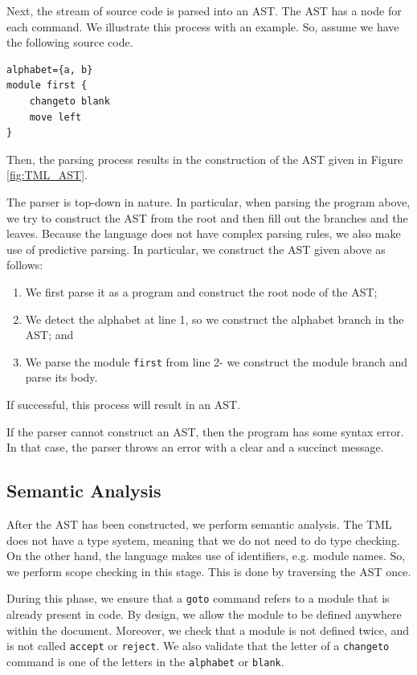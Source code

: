 Next, the stream of source code is parsed into an AST. The AST has a node for each command. We illustrate this process with an example. So, assume we have the following source code.
\begin{lstlisting}[language=TML]
alphabet={a, b}
module first {
    changeto blank
    move left
}
\end{lstlisting}
Then, the parsing process results in the construction of the AST given in Figure \ref{fig:TML_AST}. 

The parser is top-down in nature. In particular, when parsing the program above, we try to construct the AST from the root and then fill out the branches and the leaves. Because the language does not have complex parsing rules, we also make use of predictive parsing. In particular, we construct the AST given above as follows:
\begin{enumerate}
    \item We first parse it as a program and construct the root node of the AST;
    \item We detect the alphabet at line 1, so we construct the alphabet branch in the AST; and 
    \item We parse the module \texttt{first} from line 2- we construct the module branch and parse its body.
\end{enumerate}
If successful, this process will result in an AST.

If the parser cannot construct an AST, then the program has some syntax error. In that case, the parser throws an error with a clear and a succinct message.

\subsection{Semantic Analysis}
After the AST has been constructed, we perform semantic analysis. The TML does not have a type system, meaning that we do not need to do type checking. On the other hand, the language makes use of identifiers, e.g. module names. So, we perform scope checking in this stage. This is done by traversing the AST once.

During this phase, we ensure that a \texttt{goto} command refers to a module that is already present in code. By design, we allow the module to be defined anywhere within the document. Moreover, we check that a module is not defined twice, and is not called \texttt{accept} or \texttt{reject}. We also validate that the letter of a \texttt{changeto} command is one of the letters in the \texttt{alphabet} or \texttt{blank}. 

